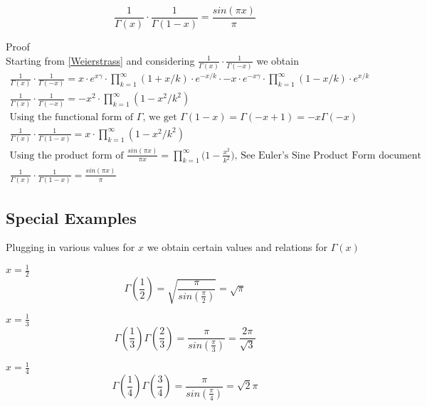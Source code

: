 \documentclass[a4paper]{article}
\begin{document}
\begin{theorem}
\begin{equation} \label{Symmetric Gamma eq}
\boxed{
\frac{1}{\Gamma(x)}\cdot \frac{1}{\Gamma(1-x)} = \frac{sin(\pi x)}{\pi}
}
\end{equation}

Proof
\\
Starting from \ref{Weierstrass} and considering $\frac{1}{\Gamma(x)}\cdot \frac{1}{\Gamma(-x)}$ we obtain
\begin{gather*}
\frac{1}{\Gamma(x)}\cdot \frac{1}{\Gamma(-x)} = x \cdot e^{x \gamma} \cdot \prod_{k=1}^{\infty} (1 + x/k) \cdot e^{-x/k}   \cdot -x \cdot e^{-x \gamma} \cdot \prod_{k=1}^{\infty} (1 - x/k) \cdot e^{x/k} 
\\
\frac{1}{\Gamma(x)}\cdot \frac{1}{\Gamma(-x)} = -x^2 \cdot \prod_{k=1}^{\infty} (1 - x^2/k^2) \\
\text{Using the functional form of $\Gamma$, we get $\Gamma(1-x) = \Gamma(-x+1) = -x \Gamma(-x)$} 
\\
\frac{1}{\Gamma(x)}\cdot \frac{1}{\Gamma(1-x)} = x \cdot \prod_{k=1}^{\infty} (1 - x^2/k^2) \\
\text{Using the product form of $\frac{sin(\pi x)}{\pi x} = \prod_{k=1}^{\infty} \Big( 1-\frac{x^2}{k^2} \Big)$
, See Euler's Sine Product Form document}
\\
\frac{1}{\Gamma(x)}\cdot \frac{1}{\Gamma(1-x)} = \frac{sin(\pi x)}{\pi}
\end{gather*}
\end{theorem}

\subsection{Special Examples}
Plugging in various values for $x$ we obtain certain values and relations for $\Gamma(x)$

$x = \frac{1}{2}$
\begin{equation} \label{gamma half}
\Gamma(\frac{1}{2}) = \sqrt{\frac{\pi}{sin(\frac{\pi}{2})}} = \sqrt{\pi}
\end{equation}

$x = \frac{1}{3}$
\begin{equation}
\Gamma(\frac{1}{3}) \Gamma(\frac{2}{3}) = \frac{\pi}{sin(\frac{\pi}{3})} = \frac{2\pi}{\sqrt{3}} 
\end{equation}

$x = \frac{1}{4}$
\begin{equation}
\Gamma(\frac{1}{4}) \Gamma(\frac{3}{4}) = \frac{\pi}{sin(\frac{\pi}{4})} = \sqrt{2} \pi 
\end{equation}
\end{document}

